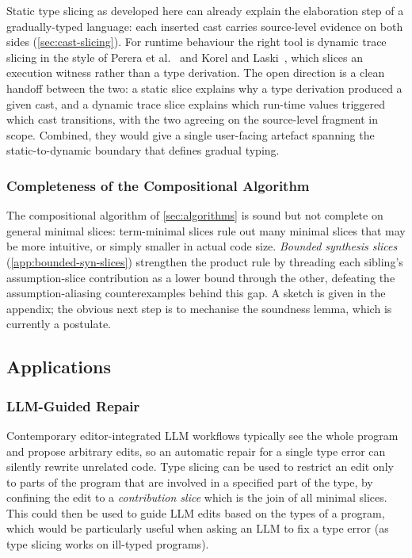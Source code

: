 Static type slicing as developed here can already explain the elaboration step of a gradually-typed language: each inserted cast carries source-level evidence on both sides (\cref{sec:cast-slicing}). For runtime behaviour the right tool is dynamic trace slicing in the style of Perera et al.~\cite{Perera2012} and Korel and Laski~\cite{KorelLaski1988}, which slices an execution witness rather than a type derivation. The open direction is a clean handoff between the two: a static slice explains why a type derivation produced a given cast, and a dynamic trace slice explains which run-time values triggered which cast transitions, with the two agreeing on the source-level fragment in scope. Combined, they would give a single user-facing artefact spanning the static-to-dynamic boundary that defines gradual typing.

\subsubsection{Completeness of the Compositional Algorithm}
\label{sec:fw-completeness}

The compositional algorithm of \cref{sec:algorithms} is sound but not complete on general minimal slices: term-minimal slices rule out many minimal slices that may be more intuitive, or simply smaller in actual code size. \emph{Bounded synthesis slices} (\cref{app:bounded-syn-slices}) strengthen the product rule by threading each sibling's assumption-slice contribution as a lower bound through the other, defeating the assumption-aliasing counterexamples behind this gap. A sketch is given in the appendix; the obvious next step is to mechanise the soundness lemma, which is currently a postulate.

\subsection{Applications}

\subsubsection{LLM-Guided Repair}
\label{sec:fw-llm-repair}

Contemporary editor-integrated LLM workflows typically see the whole program and propose arbitrary edits, so an automatic repair for a single type error can silently rewrite unrelated code. Type slicing can be used to restrict an edit only to parts of the program that are involved in a specified part of the type, by confining the edit to a \emph{contribution slice} which is the join of all minimal slices. This could then be used to guide LLM edits based on the types of a program, which would be particularly useful when asking an LLM to fix a type error (as type slicing works on ill-typed programs).


